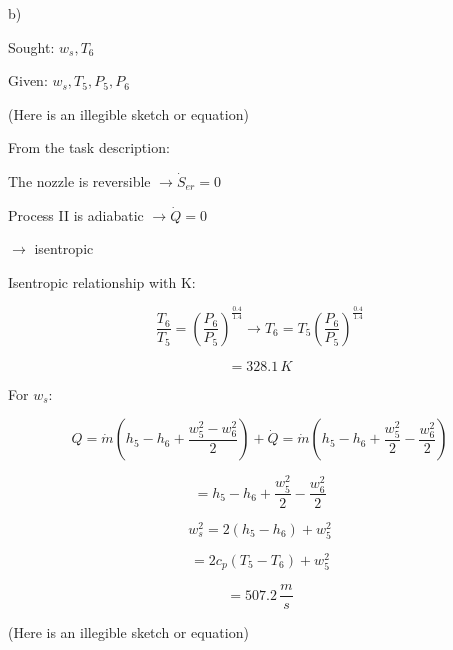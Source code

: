 b)

Sought: \(w_{s}, T_{6}\)

Given: \(w_{s}, T_{5}, P_{5}, P_{6}\)

(Here is an illegible sketch or equation)

From the task description:

The nozzle is reversible \(\rightarrow \dot{S}_{er} = 0\)

Process II is adiabatic \(\rightarrow \dot{Q} = 0\)

\(\rightarrow\) isentropic

Isentropic relationship with K:

\[
\frac{T_{6}}{T_{5}} = \left( \frac{P_{6}}{P_{5}} \right)^{\frac{0.4}{1.4}} \rightarrow T_{6} = T_{5} \left( \frac{P_{6}}{P_{5}} \right)^{\frac{0.4}{1.4}}
\]

\[
= 328.1 \, K
\]

For \(w_{s}\):

\[
Q = \dot{m} (h_{5} - h_{6} + \frac{w_{5}^{2} - w_{6}^{2}}{2}) + \dot{Q} = \dot{m} \left( h_{5} - h_{6} + \frac{w_{5}^{2}}{2} - \frac{w_{6}^{2}}{2} \right)
\]

\[
= h_{5} - h_{6} + \frac{w_{5}^{2}}{2} - \frac{w_{6}^{2}}{2}
\]

\[
w_{s}^{2} = 2 (h_{5} - h_{6}) + w_{5}^{2}
\]

\[
= 2 c_{p} (T_{5} - T_{6}) + w_{5}^{2}
\]

\[
= 507.2 \, \frac{m}{s}
\]

(Here is an illegible sketch or equation)